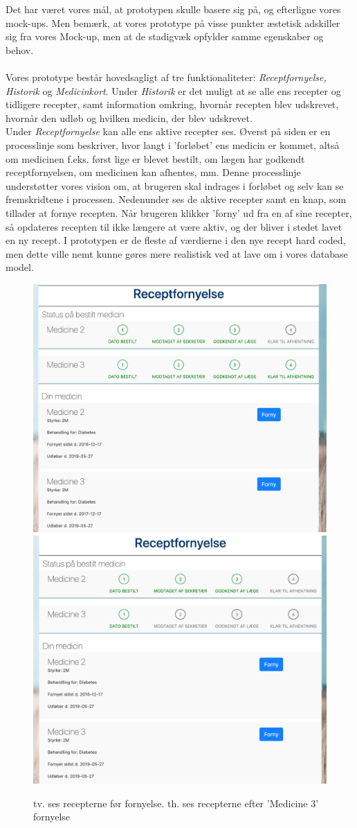 Det har været vores mål, at prototypen skulle basere sig på, og efterligne vores mock-ups. Men bemærk, at vores prototype på visse punkter æstetisk adskiller sig fra vores Mock-up, men at de stadigvæk opfylder samme egenskaber og behov. \\\\
\newpage
Vores prototype består hovedsagligt af tre funktionaliteter: \textit{Receptfornyelse, Historik} og \textit{Medicinkort}. Under \textit{Historik} er det muligt at se alle ens recepter og tidligere recepter, samt information omkring, hvornår recepten blev udskrevet, hvornår den udløb og hvilken medicin, der blev udskrevet.\\
Under \textit{Receptfornyelse} kan alle ens aktive recepter ses. Øverst på siden er en processlinje som beskriver, hvor langt i 'forløbet' ens medicin er kommet, altså om medicinen f.eks. først lige er blevet bestilt, om lægen har godkendt receptfornyelsen, om medicinen kan afhentes, mm. Denne processlinje understøtter vores vision om, at brugeren skal indrages i forløbet og selv kan se fremskridtene i processen. Nedenunder ses de aktive recepter samt en knap, som tillader at fornye recepten. Når brugeren klikker 'forny' ud fra en af sine recepter, så opdateres recepten til ikke længere at være aktiv, og der bliver i stedet lavet en ny recept. I prototypen er de fleste af værdierne i den nye recept hard coded, men dette ville nemt kunne gøres mere realistisk ved at lave om i vores database model.
\begin{figure}[h!]
	\includegraphics[width=0.49\linewidth]{Materials/Prototype/Receptfornyelse}
	\includegraphics[width=0.49\linewidth]{Materials/Prototype/ReceptfornyelseFornyet}
	\caption{tv. ses recepterne før fornyelse. th. ses recepterne efter 'Medicine 3' fornyelse}
\end{figure}
